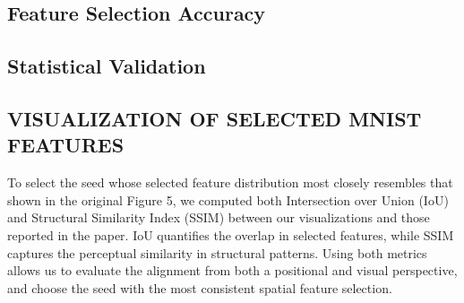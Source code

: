 \documentclass[a4paper,twocolumn]{article} %
\begin{document}
\begin{table}[ht]
\centering
{}
\caption{Comparison of mean accuracy and p-values between methods and paper baselines across datasets. Method order follows original paper: SA, LLY, GL, SL, OMP.}
\label{tab:method-comparison}
\end{table}


\subsection{Feature Selection Accuracy}


\subsection{Statistical Validation}
\subsection{VISUALIZATION OF SELECTED MNIST FEATURES}
To select the seed whose selected feature distribution most closely resembles that shown in the original Figure 5, we computed both Intersection over Union (IoU) and Structural Similarity Index (SSIM) between our visualizations and those reported in the paper. IoU quantifies the overlap in selected features, while SSIM captures the perceptual similarity in structural patterns. Using both metrics allows us to evaluate the alignment from both a positional and visual perspective, and choose the seed with the most consistent spatial feature selection.
\end{document}
